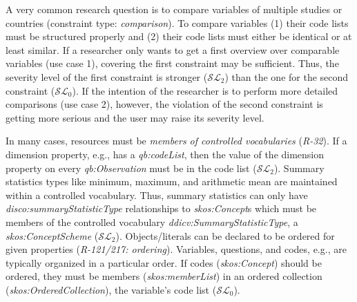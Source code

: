 \documentclass{llncs}
\begin{document}
{A very common research question is to compare variables of multiple studies or countries (constraint type: \emph{comparison}).
To compare variables 
(1) their code lists must be structured properly and
(2) their code lists must either be identical or at least similar.
If a researcher only wants to get a first overview over comparable variables (use case 1), 
covering the first constraint may be sufficient.
Thus, the severity level of the first constraint is stronger ($\mathcal{SL}_{2}$) than the one for the second constraint ($\mathcal{SL}_{0}$).
If the intention of the researcher is to perform more detailed comparisons (use case 2), however, the violation of the second constraint is getting more serious
and the user may raise its severity level.

In many cases, resources must be \emph{members of controlled vocabularies} (\emph{R-32}).
If a dimension property, e.g., has a \emph{qb:codeList},
then the value of the dimension property on every \emph{qb:Observation} must be in the code list ($\mathcal{SL}_{2}$).
Summary statistics types like minimum, maximum, and arithmetic mean are maintained within a controlled vocabulary.  
Thus, summary statistics can only have \emph{disco:summaryStatisticType} relationships to \emph{skos:Concept}s which must be members of the controlled vocabulary \emph{ddicv:SummaryStatisticType}, a \emph{skos:ConceptScheme} ($\mathcal{SL}_{2}$).
Objects/literals can be declared to be ordered for given properties (\emph{R-121/217: ordering}).
Variables, questions, and codes, e.g., are typically organized in a particular order. 
If codes (\emph{skos:Concept}) should be ordered, they must be members (\emph{skos:memberList}) in an ordered collection (\emph{skos:OrderedCollection}), the variable's code list ($\mathcal{SL}_{0}$).

}
\end{document}
